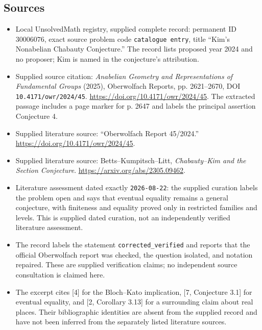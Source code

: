 \documentclass[11pt]{article}
\begin{document}
\subsection{Sources}
\begin{itemize}
\item Local UnsolvedMath registry, supplied complete record: permanent ID \(30006076\), exact source problem code \texttt{catalogue entry}, title ``Kim's Nonabelian Chabauty Conjecture.'' The record lists proposed year 2024 and no proposer; Kim is named in the conjecture's attribution.
\item Supplied source citation: \emph{Anabelian Geometry and Representations of Fundamental Groups} (2025), Oberwolfach Reports, pp. 2621--2670, DOI \texttt{10.4171/owr/2024/45}. \url{https://doi.org/10.4171/owr/2024/45}. The extracted passage includes a page marker for p. 2647 and labels the principal assertion Conjecture 4.
\item Supplied literature source: ``Oberwolfach Report 45/2024.'' \url{https://doi.org/10.4171/owr/2024/45}.
\item Supplied literature source: Betts--Kumpitsch--Litt, \emph{Chabauty--Kim and the Section Conjecture}. \url{https://arxiv.org/abs/2305.09462}.
\item Literature assessment dated exactly \texttt{2026-08-22}: the supplied curation labels the problem open and says that eventual equality remains a general conjecture, with finiteness and equality proved only in restricted families and levels. This is supplied dated curation, not an independently verified literature assessment.
\item The record labels the statement \texttt{corrected\_verified} and reports that the official Oberwolfach report was checked, the question isolated, and notation repaired. These are supplied verification claims; no independent source consultation is claimed here.
\item The excerpt cites [4] for the Bloch--Kato implication, [7, Conjecture 3.1] for eventual equality, and [2, Corollary 3.13] for a surrounding claim about real places. Their bibliographic identities are absent from the supplied record and have not been inferred from the separately listed literature sources.
\end{itemize}
\end{document}
